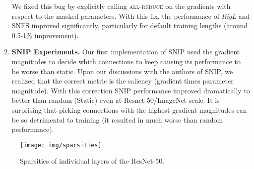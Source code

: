 \documentclass{article}
\begin{document}
\begin{enumerate}
    We fixed this bug by explicitly calling \textsc{all-reduce} on the gradients with respect to the masked parameters. With this fix, the performance of {\em RigL} and SNFS improved significantly, particularly for default training lengths (around 0.5-1\% improvement).

    \item \textbf{SNIP Experiments.} Our first implementation of SNIP used the gradient magnitudes to decide which connections to keep causing its performance to be worse than static. Upon our discussions with the authors of SNIP, we realized that the correct metric is the saliency (gradient times parameter magnitude). With this correction SNIP performance improved dramatically to better than random (Static) even at Resnet-50/ImageNet scale. It is surprising that picking connections with the highest gradient magnitudes can be so detrimental to training (it resulted in much worse than random performance).
\end{enumerate}
\begin{figure*}
\centering
  \texttt{[image: img/sparsities]}
\caption{Sparsities of individual layers of the ResNet-50.}
\label{fig:app:sparsities}
\end{figure*}
\end{document}
